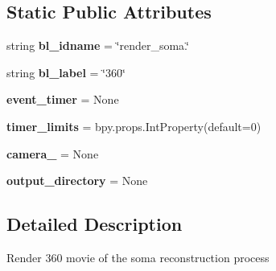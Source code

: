\subsection*{Static Public Attributes}
\begin{DoxyCompactItemize}
\item 
string {\bfseries bl\+\_\+idname} = \char`\"{}render\+\_\+soma.\char`\"{}\hypertarget{classui__soft__body__panel_1_1RenderSoma360_ab0ffd1f5eaaf3630c267b61af6147164}{}\label{classui__soft__body__panel_1_1RenderSoma360_ab0ffd1f5eaaf3630c267b61af6147164}

\item 
string {\bfseries bl\+\_\+label} = \char`\"{}360\char`\"{}\hypertarget{classui__soft__body__panel_1_1RenderSoma360_a1d232070cbc85a764f5c9cb7ad9d0038}{}\label{classui__soft__body__panel_1_1RenderSoma360_a1d232070cbc85a764f5c9cb7ad9d0038}

\item 
{\bfseries event\+\_\+timer} = None\hypertarget{classui__soft__body__panel_1_1RenderSoma360_aafcc5b2fba6e5d28d5b25825ce6a5a3c}{}\label{classui__soft__body__panel_1_1RenderSoma360_aafcc5b2fba6e5d28d5b25825ce6a5a3c}

\item 
{\bfseries timer\+\_\+limits} = bpy.\+props.\+Int\+Property(default=0)\hypertarget{classui__soft__body__panel_1_1RenderSoma360_a9f78a2437ab8cc9a6aa9d5b2b675670f}{}\label{classui__soft__body__panel_1_1RenderSoma360_a9f78a2437ab8cc9a6aa9d5b2b675670f}

\item 
{\bfseries camera\+\_} = None\hypertarget{classui__soft__body__panel_1_1RenderSoma360_a37124f5d96f6856dc1901cee1f810815}{}\label{classui__soft__body__panel_1_1RenderSoma360_a37124f5d96f6856dc1901cee1f810815}

\item 
{\bfseries output\+\_\+directory} = None\hypertarget{classui__soft__body__panel_1_1RenderSoma360_a9ec6f2bb4edf2d6e68dda8b177e34568}{}\label{classui__soft__body__panel_1_1RenderSoma360_a9ec6f2bb4edf2d6e68dda8b177e34568}

\end{DoxyCompactItemize}


\subsection{Detailed Description}
\begin{DoxyVerb}Render 360 movie of the soma reconstruction process\end{DoxyVerb}
 

